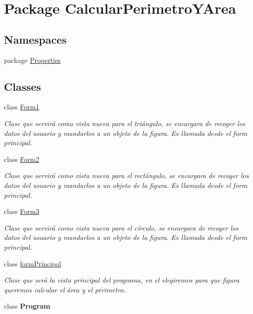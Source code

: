 \hypertarget{namespace_calcular_perimetro_y_area}{}\section{Package Calcular\+Perimetro\+Y\+Area}
\label{namespace_calcular_perimetro_y_area}
\subsection*{Namespaces}
\begin{DoxyCompactItemize}
\item 
package \hyperlink{namespace_calcular_perimetro_y_area_1_1_properties}{Properties}
\end{DoxyCompactItemize}
\subsection*{Classes}
\begin{DoxyCompactItemize}
\item 
class \hyperlink{class_calcular_perimetro_y_area_1_1_form1}{Form1}
\begin{DoxyCompactList}\small\item\em Clase que servirá como vista nueva para el triángulo, se encargara de recoger los datos del usuario y mandarlos a un objeto de la figura. Es llamada desde el form principal. \end{DoxyCompactList}\item 
class \hyperlink{class_calcular_perimetro_y_area_1_1_form2}{Form2}
\begin{DoxyCompactList}\small\item\em Clase que servirá como vista nueva para el rectángulo, se encargara de recoger los datos del usuario y mandarlos a un objeto de la figura. Es llamada desde el form principal. \end{DoxyCompactList}\item 
class \hyperlink{class_calcular_perimetro_y_area_1_1_form3}{Form3}
\begin{DoxyCompactList}\small\item\em Clase que servirá como vista nueva para el círculo, se encargara de recoger los datos del usuario y mandarlos a un objeto de la figura. Es llamada desde el form principal. \end{DoxyCompactList}\item 
class \hyperlink{class_calcular_perimetro_y_area_1_1form_principal}{form\+Principal}
\begin{DoxyCompactList}\small\item\em Clase que será la vista principal del programa, en el elegiremos para que figura queremos calcular el área y el périmetro. \end{DoxyCompactList}\item 
class {\bfseries Program}
\end{DoxyCompactItemize}
